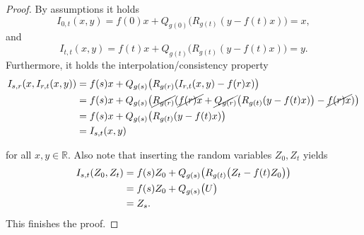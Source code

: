 \documentclass[10pt,a4paper]{amsart}
\begin{document}
\begin{proof}
By  assumptions it holds 
\begin{equation*}
   I_{0,t}(x, y) = f(0) x + Q_{g(0)}\big(R_{g(t)}(y - f(t)x) \big) = x,
\end{equation*}
and 
\begin{equation*}
   I_{t,t}(x, y) = f(t) x + Q_{g(t)}\big(R_{g(t)}(y - f(t)x) \big) = y.
\end{equation*}
Furthermore, it holds the interpolation/consistency property
\begin{align}\label{interpolation1}
    I_{s,r}(x,  I_{r,t}(x,y)) 
    &= f(s) x + Q_{g(s)}\big(R_{g(r)}( I_{r,t}(x,y) - f(r)x) \big) \notag\\
    &= f(s) x + Q_{g(s)}\big( \cancel{R_{g(r)}} ( \cancel{f(r)x} + \cancel{Q_{g(r)}}\big(R_{g(t)}(y - f(t)x) \big) - \cancel{f(r)x}) \big)
    \notag\\
    &= f(s) x + Q_{g(s)}\big( R_{g(t)}(y - f(t)x) \big) \notag\\
    &= I_{s,t}(x,y)
\end{align}

for all $x, y \in \mathbb{R}$.
Also note that inserting the random variables $Z_0, Z_t$ yields
\begin{align}
    I_{s,t}(Z_0, Z_t) &= f(s) Z_0 + Q_{g(s)}\big(R_{g(t)} \big(Z_t - f(t)Z_0 \big) \big) \notag\\
    &= f(s) Z_0 + Q_{g(s)}\big( U \big) \notag\\
    &= Z_s.
\end{align}
This finishes the proof.
\end{proof}
\end{document}
